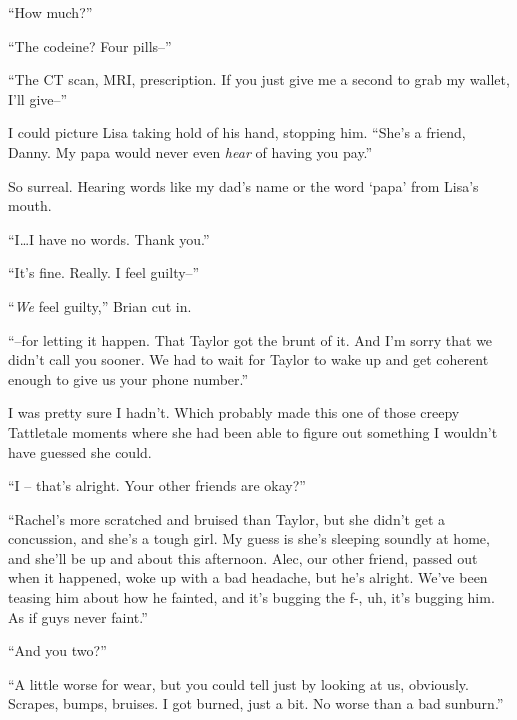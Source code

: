 ``How much?''



``The codeine?  Four pills--''



``The CT scan, MRI, prescription.  If you just give me a second to grab my wallet, I'll give--''



I could picture Lisa taking hold of his hand, stopping him.  ``She's a friend, Danny.  My papa would never even \emph{hear} of having you pay.''



So surreal.  Hearing words like my dad's name or the word `papa' from Lisa's mouth.



``I\ldots I have no words.  Thank you.''



``It's fine.  Really.  I feel guilty--''



``\emph{We} feel guilty,'' Brian cut in.



``--for letting it happen.  That Taylor got the brunt of it.  And I'm sorry that we didn't call you sooner.  We had to wait for Taylor to wake up and get coherent enough to give us your phone number.''



I was pretty sure I hadn't.  Which probably made this one of those creepy Tattletale moments where she had been able to figure out something I wouldn't have guessed she could.



``I – that's alright.  Your other friends are okay?''



``Rachel's more scratched and bruised than Taylor, but she didn't get a concussion, and she's a tough girl.  My guess is she's sleeping soundly at home, and she'll be up and about this afternoon.  Alec, our other friend, passed out when it happened, woke up with a bad headache, but he's alright.  We've been teasing him about how he fainted, and it's bugging the f-, uh, it's bugging him.  As if guys never faint.''



``And you two?''



``A little worse for wear, but you could tell just by looking at us, obviously.  Scrapes, bumps, bruises.  I got burned, just a bit.  No worse than a bad sunburn.''



